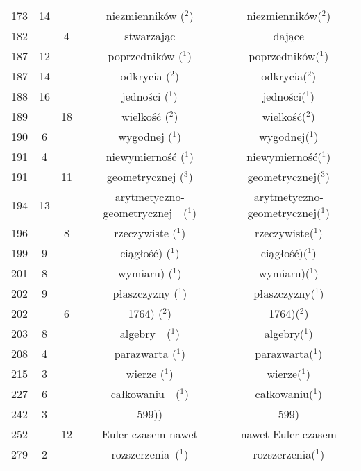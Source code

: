 \documentclass[a4paper,11pt]{article}
\begin{document}
\begin{center}
\begin{tabular}{|c|c|c|c|c|}
    173 & 14 & & niezmienników ($^{ 2 }$) & niezmienników($^{ 2 }$) \\
    182 & &  4 & stwarzając & dające \\
    187 & 12 & & poprzedników ($^{ 1 }$) & poprzedników($^{ 1 }$) \\
    187 & 14 & & odkrycia ($^{ 2 }$) & odkrycia($^{ 2 }$) \\
    188 & 16 & & jedności ($^{ 1 }$) & jedności($^{ 1 }$) \\
    189 & & 18 & wielkość ($^{ 2 }$) & wielkość($^{ 2 }$) \\
    190 &  6 & & wygodnej ($^{ 1 }$) & wygodnej($^{ 1 }$) \\
    191 &  4 & & niewymierność ($^{ 1 }$) & niewymierność($^{ 1 }$) \\
    191 & & 11 & geometrycznej ($^{ 3 }$) & geometrycznej($^{ 3 }$) \\
    194 & 13 & & arytmetyczno-geometrycznej~~($^{ 1 }$)
           & arytmetyczno-geometrycznej($^{ 1 }$) \\
    196 & &  8 & rzeczywiste ($^{ 1 }$) & rzeczywiste($^{ 1 }$) \\
    199 &  9 & & ciągłość) ($^{ 1 }$) & ciągłość)($^{ 1 }$) \\
    201 &  8 & & wymiaru) ($^{ 1 }$) & wymiaru)($^{ 1 }$) \\
    202 &  9 & & płaszczyzny ($^{ 1 }$) & płaszczyzny($^{ 1 }$) \\
    202 & &  6 & 1764) ($^{ 2 }$) & 1764)($^{ 2 }$) \\
    203 &  8 & & algebry~~($^{ 1 }$) & algebry($^{ 1 }$) \\
    208 &  4 & & parazwarta ($^{ 1 }$) & parazwarta($^{ 1 }$) \\
    215 &  3 & & wierze ($^{ 1 }$) & wierze($^{ 1 }$) \\
    227 &  6 & & całkowaniu~~($^{ 1 }$) & całkowaniu($^{ 1 }$) \\
    242 &  3 & & 599)) & 599) \\
    252 & & 12 & Euler czasem nawet & nawet Euler czasem \\
    279 &  2 & & rozszerzenia~($^{ 1 }$) & rozszerzenia($^{ 1 }$) \\
    \hline
  \end{tabular}

\end{center}
\end{document}
